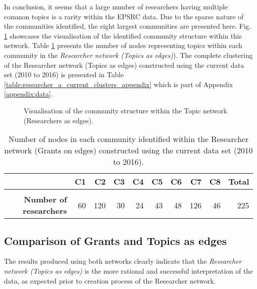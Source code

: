{In conclusion, it seems that a large number of researchers having multiple common topics is a rarity within the EPSRC data. Due to the sparse nature of the communities identified, the eight largest communities are presented here. Fig. \ref{fig:researcher_a_current_cs} showcases the visualisation of the identified community structure within this network. Table \ref{table:researcher_a_current_numbers} presents the number of nodes representing topics within each community in the \textit{Researcher network (Topics as edges)}). The complete clustering of the Researcher network (Topics as edges) constructed using the current data set (2010 to 2016) is presented in Table \ref{table:researcher_a_current_clusters_appendix} which is part of Appendix \ref{appendix:data}.

\begin{figure}[!htpb]
    \centering
    \caption[Visualisation of the community structure within the Researcher network (Topics as edges).]{Visualisation of the community structure within the Topic network (Researchers as edges).}
    \label{fig:researcher_a_current_cs}
\end{figure}

\begin{table}[!htbp]
\centering
\caption[Number of nodes in each community within the Researcher network (Topics as edges) constructed using the current data set (2010 to 2016).]{Number of nodes in each community identified within the Researcher network (Grants on edges) constructed using the current data set (2010 to 2016).}
\label{table:researcher_a_current_numbers}
\begin{tabular}{r|rrrrrrrrr}
{} & \textbf{C1} & \textbf{C2} & \textbf{C3} & \textbf{C4} & \textbf{C5} & \textbf{C6} & \textbf{C7} & \textbf{C8} & \textbf{Total}\\
\hline\\
\textbf{Number of researchers} & {60} & {120} & {30} & {24} & {43} & {48} & {126} & {46} & {225}
\end{tabular}
\end{table}

\subsection{Comparison of Grants and Topics as edges}

The results produced using both networks clearly indicate that the \textit{Researcher network (Topics as edges)} is the more rational and successful interpretation of the data, as expected prior to creation process of the Researcher network.

}
